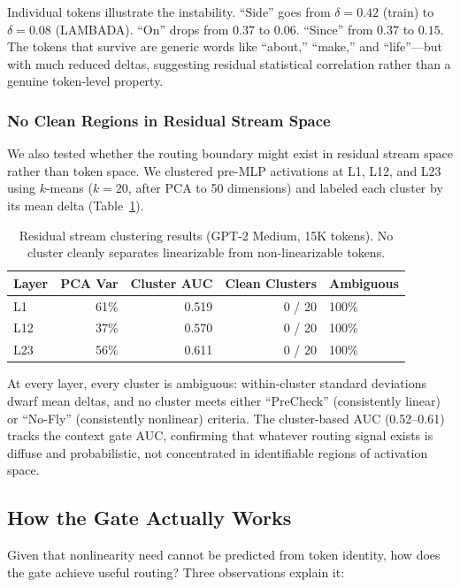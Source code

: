 \documentclass[11pt]{article}
\begin{document}
Individual tokens illustrate the instability. ``Side'' goes from $\delta = 0.42$ (train) to $\delta = 0.08$ (LAMBADA). ``On'' drops from $0.37$ to $0.06$. ``Since'' from $0.37$ to $0.15$. The tokens that survive are generic words like ``about,'' ``make,'' and ``life''---but with much reduced deltas, suggesting residual statistical correlation rather than a genuine token-level property.

\subsubsection{No Clean Regions in Residual Stream Space}

We also tested whether the routing boundary might exist in residual stream space rather than token space. We clustered pre-MLP activations at L1, L12, and L23 using $k$-means ($k=20$, after PCA to 50 dimensions) and labeled each cluster by its mean delta (Table~\ref{tab:clusters}).

\begin{table}[t]
\centering
\caption{Residual stream clustering results (GPT-2 Medium, 15K tokens). No cluster cleanly separates linearizable from non-linearizable tokens.}
\label{tab:clusters}
\begin{tabular}{lrrrl}
\toprule
Layer & PCA Var & Cluster AUC & Clean Clusters & Ambiguous \\
\midrule
L1 & 61\% & 0.519 & 0 / 20 & 100\% \\
L12 & 37\% & 0.570 & 0 / 20 & 100\% \\
L23 & 56\% & 0.611 & 0 / 20 & 100\% \\
\bottomrule
\end{tabular}
\end{table}

At every layer, every cluster is ambiguous: within-cluster standard deviations dwarf mean deltas, and no cluster meets either ``PreCheck'' (consistently linear) or ``No-Fly'' (consistently nonlinear) criteria. The cluster-based AUC (0.52--0.61) tracks the context gate AUC, confirming that whatever routing signal exists is diffuse and probabilistic, not concentrated in identifiable regions of activation space.

\subsection{How the Gate Actually Works}

Given that nonlinearity need cannot be predicted from token identity, how does the gate achieve useful routing? Three observations explain it:
\end{document}

